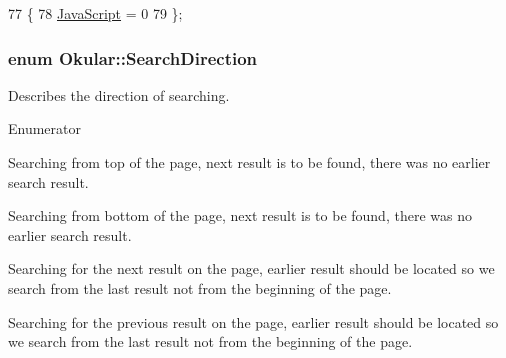 \begin{DoxyCode}
77 \{
78     \hyperlink{namespaceOkular_a061f34ff835b2d2142fef28bcfd09325ac61eb96a387ac39266f6eb71948796ea}{JavaScript} = 0           
79 \};
\end{DoxyCode}
\hypertarget{namespaceOkular_ad7ede3c5a1b1a8bfd83f133e7e3ed9d2}{
\subsubsection[{Search\+Direction}]{\setlength{\rightskip}{0pt plus 5cm}enum {\bf Okular\+::\+Search\+Direction}}}\label{namespaceOkular_ad7ede3c5a1b1a8bfd83f133e7e3ed9d2}
Describes the direction of searching. \begin{Desc}
\item[Enumerator]\par
\begin{description}
\item[{\em 
\hypertarget{namespaceOkular_ad7ede3c5a1b1a8bfd83f133e7e3ed9d2a12e1e0d5fba44b6eb075863eb0992cf6}{From\+Top}\label{namespaceOkular_ad7ede3c5a1b1a8bfd83f133e7e3ed9d2a12e1e0d5fba44b6eb075863eb0992cf6}
}]Searching from top of the page, next result is to be found, there was no earlier search result. \item[{\em 
\hypertarget{namespaceOkular_ad7ede3c5a1b1a8bfd83f133e7e3ed9d2a1a146d4130e3d6f0ad12fd5ee6fc3497}{From\+Bottom}\label{namespaceOkular_ad7ede3c5a1b1a8bfd83f133e7e3ed9d2a1a146d4130e3d6f0ad12fd5ee6fc3497}
}]Searching from bottom of the page, next result is to be found, there was no earlier search result. \item[{\em 
\hypertarget{namespaceOkular_ad7ede3c5a1b1a8bfd83f133e7e3ed9d2ae206453ab991a0ffea7c198f8ef600c4}{Next\+Result}\label{namespaceOkular_ad7ede3c5a1b1a8bfd83f133e7e3ed9d2ae206453ab991a0ffea7c198f8ef600c4}
}]Searching for the next result on the page, earlier result should be located so we search from the last result not from the beginning of the page. \item[{\em 
\hypertarget{namespaceOkular_ad7ede3c5a1b1a8bfd83f133e7e3ed9d2ad604ce7efcb1e2987d9503404f34a504}{Previous\+Result}\label{namespaceOkular_ad7ede3c5a1b1a8bfd83f133e7e3ed9d2ad604ce7efcb1e2987d9503404f34a504}
}]Searching for the previous result on the page, earlier result should be located so we search from the last result not from the beginning of the page. \end{description}
\end{Desc}



